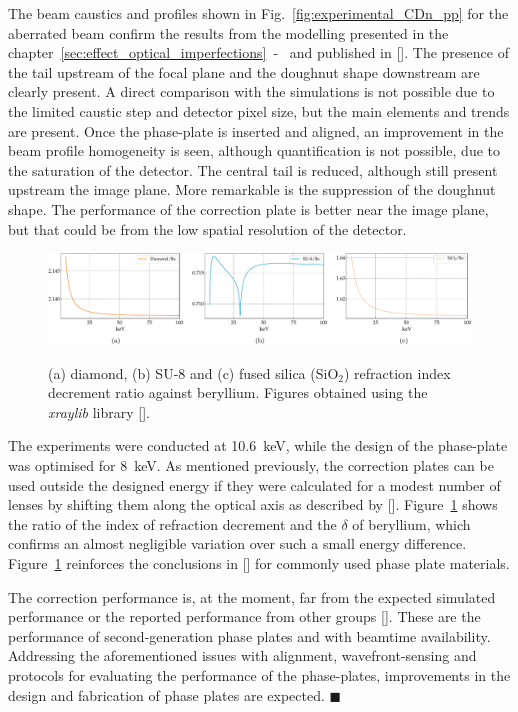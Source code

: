 \begin{refsection}
The beam caustics and profiles shown in Fig.~\ref{fig:experimental_CDn_pp} for the aberrated beam confirm the results from the modelling presented in the chapter~\ref{sec:effect_optical_imperfections}~-~\textit{} and published in [\cite{Celestre2020}]. The presence of the tail upstream of the focal plane and the doughnut shape downstream are clearly present. A direct comparison with the simulations is not possible due to the limited caustic step and detector pixel size, but the main elements and trends are present. Once the phase-plate is inserted and aligned, an improvement in the beam profile homogeneity is seen, although quantification is not possible, due to the saturation of the detector. The central tail is reduced, although still present upstream the image plane. More remarkable is the suppression of the doughnut shape. The performance of the correction plate is better near the image plane, but that could be from the low spatial resolution of the detector. 

\begin{figure}[t]
    \centering
    {\includegraphics[width=1\linewidth]{figures/ch03/n_plate.pdf}}
    \caption[Index of refraction ratio for common phase plate materials]{(a) diamond, (b) SU-8 and (c) fused silica (SiO$_2$) refraction index decrement ratio against beryllium. Figures obtained using the \textit{xraylib} library [\cite{Brunetti2004, Schoonjans2011}].}
    \label{fig:delta_correction_plate}
\end{figure}

The experiments were conducted at 10.6~keV, while the design of the phase-plate was optimised for 8~keV. As mentioned previously, the correction plates can be used outside the designed energy if they were calculated for a modest number of lenses by shifting them along the optical axis as described by [\cite[\textit{\S6}]{Seiboth2018}]. Figure~\ref{fig:delta_correction_plate} shows the ratio of the index of refraction decrement and the $\delta$ of beryllium, which confirms an almost negligible variation over such a small energy difference. Figure~\ref{fig:delta_correction_plate} reinforces the conclusions in [\cite[\textit{\S6}]{Seiboth2018}] for commonly used phase plate materials.

The correction performance is, at the moment, far from the expected simulated performance or the reported performance from other groups [\cite{Seiboth2017,Seiboth2018,Seiboth2020,Dhamgaye2020}]. These are the performance of second-generation phase plates and with beamtime availability. Addressing the aforementioned issues with alignment, wavefront-sensing and protocols for evaluating the performance of the phase-plates, improvements in the design and fabrication of phase plates are expected.  $\blacksquare$

\printbibliography[heading=subbibliography]
\end{refsection}
